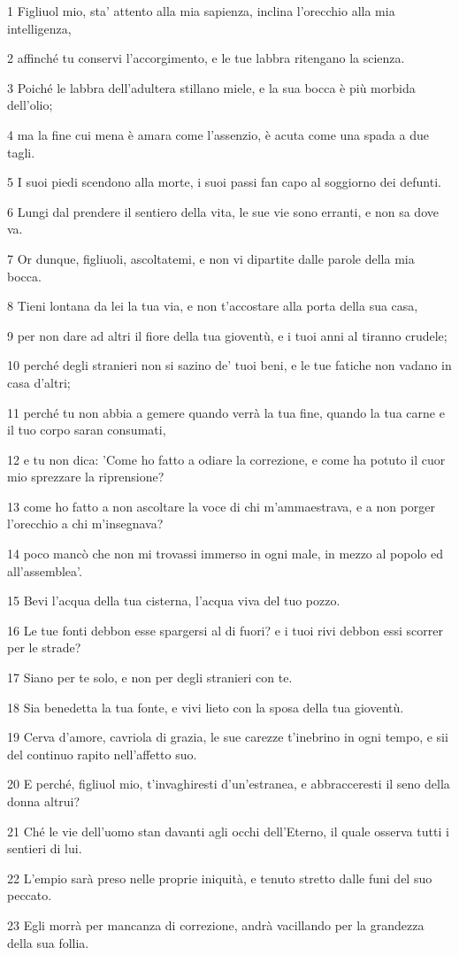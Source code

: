 \par 1 Figliuol mio, sta' attento alla mia sapienza, inclina l'orecchio alla mia intelligenza,
\par 2 affinché tu conservi l'accorgimento, e le tue labbra ritengano la scienza.
\par 3 Poiché le labbra dell'adultera stillano miele, e la sua bocca è più morbida dell'olio;
\par 4 ma la fine cui mena è amara come l'assenzio, è acuta come una spada a due tagli.
\par 5 I suoi piedi scendono alla morte, i suoi passi fan capo al soggiorno dei defunti.
\par 6 Lungi dal prendere il sentiero della vita, le sue vie sono erranti, e non sa dove va.
\par 7 Or dunque, figliuoli, ascoltatemi, e non vi dipartite dalle parole della mia bocca.
\par 8 Tieni lontana da lei la tua via, e non t'accostare alla porta della sua casa,
\par 9 per non dare ad altri il fiore della tua gioventù, e i tuoi anni al tiranno crudele;
\par 10 perché degli stranieri non si sazino de' tuoi beni, e le tue fatiche non vadano in casa d'altri;
\par 11 perché tu non abbia a gemere quando verrà la tua fine, quando la tua carne e il tuo corpo saran consumati,
\par 12 e tu non dica: 'Come ho fatto a odiare la correzione, e come ha potuto il cuor mio sprezzare la riprensione?
\par 13 come ho fatto a non ascoltare la voce di chi m'ammaestrava, e a non porger l'orecchio a chi m'insegnava?
\par 14 poco mancò che non mi trovassi immerso in ogni male, in mezzo al popolo ed all'assemblea'.
\par 15 Bevi l'acqua della tua cisterna, l'acqua viva del tuo pozzo.
\par 16 Le tue fonti debbon esse spargersi al di fuori? e i tuoi rivi debbon essi scorrer per le strade?
\par 17 Siano per te solo, e non per degli stranieri con te.
\par 18 Sia benedetta la tua fonte, e vivi lieto con la sposa della tua gioventù.
\par 19 Cerva d'amore, cavriola di grazia, le sue carezze t'inebrino in ogni tempo, e sii del continuo rapito nell'affetto suo.
\par 20 E perché, figliuol mio, t'invaghiresti d'un'estranea, e abbracceresti il seno della donna altrui?
\par 21 Ché le vie dell'uomo stan davanti agli occhi dell'Eterno, il quale osserva tutti i sentieri di lui.
\par 22 L'empio sarà preso nelle proprie iniquità, e tenuto stretto dalle funi del suo peccato.
\par 23 Egli morrà per mancanza di correzione, andrà vacillando per la grandezza della sua follia.


